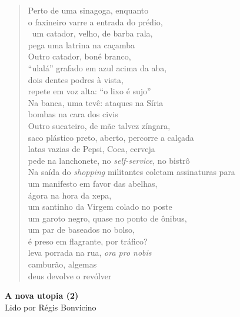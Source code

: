\begin{verse}
Perto de uma sinagoga, enquanto\\
o faxineiro varre a entrada do prédio,\\\
um catador, velho, de barba rala,\\
pega uma latrina na caçamba\\[5pt]
Outro catador, boné branco,\\
``ulalá'' grafado em azul acima da aba,\\
dois dentes podres à vista,\\
repete em voz alta: ``o lixo é sujo''\\[5pt]
Na banca, uma tevê: ataques na Síria\\
bombas na cara dos civis\\
Outro sucateiro, de mãe talvez zíngara,\\
saco plástico preto, aberto, percorre a calçada\\[5pt]
latas vazias de Pepsi, Coca, cerveja\\
pede na lanchonete, no \emph{self-service}, no bistrô\\
Na saída do \emph{shopping} militantes coletam assinaturas para\\
um manifesto em favor das abelhas,\\[5pt]
ágora na hora da xepa,\\
um santinho da Virgem colado no poste\\
um garoto negro, quase no ponto de ônibus,\\
um par de baseados no bolso,\\[5pt]
é preso em flagrante, por tráfico?\\
leva porrada na rua, \emph{ora pro nobis}\\
camburão, algemas\\
deus devolve o revólver
\end{verse}

\pagebreak

\textbf{A nova utopia (2)}\\
Lido por Régis Bonvicino

